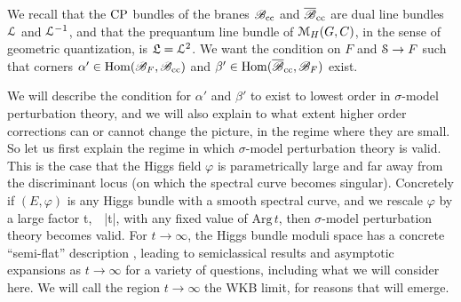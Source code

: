 \documentclass[11pt,a4paper]{article}
\begin{document}
We recall that the $\CP$ bundles of the branes $\B_\cc$ and $\b\B_\cc$ are dual line bundles $\L$ and $\L^{-1}$, and that the prequantum line bundle
of  $\M_H(G,C)$, in the sense of geometric quantization, is $\frL=\L^2$.    We want the condition on $F$ and $\S\to F$ such that corners
$\alpha'\in \Hom(\B_F,\B_\cc)$ and $\beta'\in \Hom(\b\B_\cc,\B_F)$ exist.    

We will describe the condition for $\alpha'$ and $\beta'$ to exist to lowest order in $\sigma$-model perturbation theory, and we will also explain to what
extent higher order corrections can or cannot change the picture, in the regime where they are small.   So let us first explain the regime in which $\sigma$-model
perturbation theory is valid.   This is the case that the Higgs field $\varphi$ is parametrically large and far away from the discriminant locus (on which
the spectral curve becomes singular).   Concretely if $(E,\varphi)$ is any Higgs bundle with a smooth spectral curve, and we rescale $\varphi$ by
a large factor 
\be\label{kcf} \varphi\to t\varphi,~~|t|,\ee
with any fixed value of $\mathrm{Arg}\,t$,  then $\sigma$-model perturbation theory becomes valid.   For $t\to\infty$, the Higgs bundle
moduli space has  a concrete ``semi-flat'' description \cite{GMN}, leading to semiclassical results and asymptotic expansions as $t\to\infty$ for a variety of questions, including what we will consider here.   We will call the region $t\to\infty$ the WKB limit, for reasons that will emerge.
\end{document}
